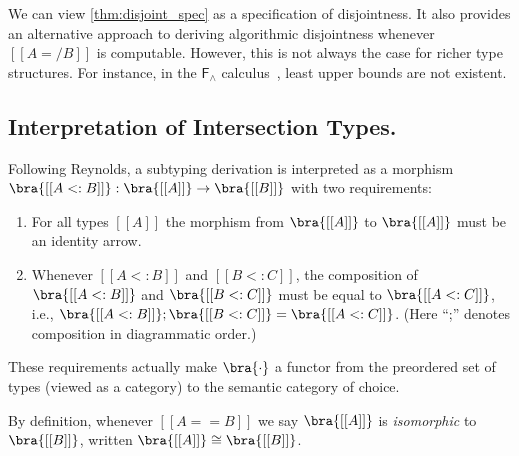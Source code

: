 We can view \cref{thm:disjoint_spec} as a specification of disjointness. It also
provides an alternative approach to deriving algorithmic disjointness whenever
$[[A =/ B]]$ is computable. However, this is not always the case for richer type
structures. For instance, in the $\mathsf{F}_{\land}$ calculus~\citep{pierce1991programming}, least
upper bounds are not existent.







\subsection{Interpretation of Intersection Types.}

Following Reynolds, a subtyping derivation is interpreted as a morphism $ \bra{[[ A <: B ]]} : \bra{[[A]]} \rightarrow \bra{[[B]]} $ with two requirements:
\begin{enumerate}
\item For all types $[[A]]$ the morphism from $ \bra{[[A]]}$ to $\bra{[[A]]}$ must be an identity arrow.
\item Whenever $[[A <: B]]$ and $[[ B <: C  ]]$, the composition of $\bra{[[ A <: B ]]}$ and $\bra{[[  B <: C   ]]}$ must be equal to $\bra{[[  A <: C  ]]}$, i.e., $ \bra{[[ A <: B ]]} ; \bra{[[  B <: C  ]]} = \bra{[[A <: C]]}$. (Here ``;'' denotes composition in diagrammatic order.)
\end{enumerate}
These requirements actually make $ \bra{\cdot} $ a functor from the
preordered set of types (viewed as a category) to the semantic category of
choice.

\begin{remark}
By definition, whenever $[[ A == B ]]$ we say $\bra{[[  A  ]]}$ is \textit{isomorphic} to $\bra{[[ B ]]}$, written $\bra{[[ A ]]} \cong \bra{[[B]]}$.
\end{remark}

